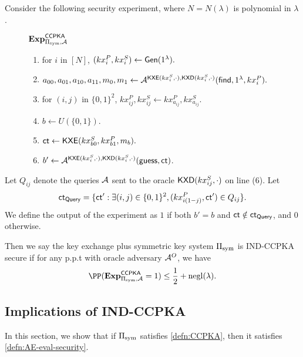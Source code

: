 \begin{definition}
\label{defn:CCPKA}
Consider the following security experiment, where $N = N(\lambda)$ is polynomial in $\lambda$.
\begin{figure}[h!]
\begin{framed}
$\mathbf{Exp}^{\mathsf{CCPKA}}_{\Pi_{\text{sym}}, \mathcal{A}}$
\begin{enumerate}
    \item for $i$ in $[N]$, $(kx_{i}^P, kx_{i}^S) \leftarrow \mathsf{Gen}(1^{\lambda}).$
    \item $a_{00}, a_{01}, a_{10}, a_{11}, m_0, m_1 \leftarrow \mathcal{A}^{\mathsf{KXE}(kx_{i}^S, \cdot), \mathsf{KXD}(kx_{i}^S, \cdot)}(\mathsf{find}, 1^{\lambda}, kx_{i}^P).$
    \item for $(i, j)$ in $\{0, 1\}^2$, $kx^{P}_{ij}, kx^S_{ij} \leftarrow kx^P_{a_{ij}}, kx^S_{a_{ij}}$. 
    \item $b \leftarrow U(\{0, 1\})$.
    \item $\mathsf{ct} \leftarrow \mathsf{KXE}(kx_{b0}^S, kx_{b1}^P, m_b).$
    \item $b' \leftarrow \mathcal{A}^{\mathsf{KXE}(kx_{i}^S, \cdot), \mathsf{KXD}(kx_{i}^S, \cdot)}(\mathsf{guess}, \mathsf{ct})$.
\end{enumerate}
\end{framed}
\end{figure}

Let $Q_{ij}$ denote the queries $\mathcal{A}$ sent to the oracle $\mathsf{KXD}(kx_{ij}^S, \cdot)$ on line (6). Let
$$\mathsf{ct}_{\mathsf{Query}} = \{\mathsf{ct}': \exists (i,j) \in \{0, 1\}^2, (kx_{i(1 - j)}^P, \mathsf{ct}') \in Q_{ij}\}.$$
We define the output of the experiment as $1$ if both $b' = b$ and $\mathsf{ct} \notin \mathsf{ct}_{\mathsf{Query}}$, and $0$ otherwise. 

Then we say the key exchange plus symmetric key system $\Pi_{\text{sym}}$ is IND-CCPKA secure if for any p.p.t with oracle adversary $\mathcal{A}^O$, we have
$$\PP(\mathbf{Exp}^{\mathsf{CCPKA}}_{\Pi_{\sym}, \cA} = 1) \leq \frac{1}{2} + \negl(\lambda).$$
\end{definition}
\subsection{Implications of IND-CCPKA}
In this section, we show that if $\Pi_{\text{sym}}$ satisfies \cref{defn:CCPKA}, then it satisfies \cref{defn:AE-eval-security}.

